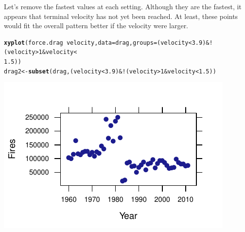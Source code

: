 \documentclass[twoside]{book}
\makeatletter
\def\maxwidth{ %
  \ifdim\Gin@nat@width>\linewidth
    \linewidth
  \else
    \Gin@nat@width
  \fi
}
\newcommand{\hlnum}[1]{\textcolor[rgb]{0.686,0.059,0.569}{#1}}%
\newcommand{\hlopt}[1]{\textcolor[rgb]{0,0,0}{#1}}%
\newcommand{\hlstd}[1]{\textcolor[rgb]{0.345,0.345,0.345}{#1}}%
\newcommand{\hlkwb}[1]{\textcolor[rgb]{0.69,0.353,0.396}{#1}}%
\newcommand{\hlkwc}[1]{\textcolor[rgb]{0.333,0.667,0.333}{#1}}%
\newcommand{\hlkwd}[1]{\textcolor[rgb]{0.737,0.353,0.396}{\textbf{#1}}}%
\newenvironment{kframe}{%
 \def\at@end@of@kframe{}%
 \ifinner\ifhmode%
  \def\at@end@of@kframe{\end{minipage}}%
  \begin{minipage}{\columnwidth}%
 \fi\fi%
 \def\FrameCommand##1{\hskip\@totalleftmargin \hskip-\fboxsep
 \colorbox{shadecolor}{##1}\hskip-\fboxsep
     \hskip-\linewidth \hskip-\@totalleftmargin \hskip\columnwidth}%
 \MakeFramed {\advance\hsize-\width
   \@totalleftmargin\z@ \linewidth\hsize
   \@setminipage}}%
 {\par\unskip\endMakeFramed%
 \at@end@of@kframe}
\newenvironment{knitrout}{}{} %
\makeatother
\begin{document}
\begin{solution}
Let's remove the fastest values at each setting.  Although they are the fastest, it appears 
that terminal velocity has not yet been reached.  At least, these points would fit the 
overall pattern better if the velocity were larger.
\begin{knitrout}
\color{fgcolor}\begin{kframe}
\begin{alltt}
\hlkwd{xyplot}\hlstd{(force.drag} \hlopt{~} \hlstd{velocity,} \hlkwc{data} \hlstd{= drag,} \hlkwc{groups} \hlstd{= (velocity} \hlopt{<} \hlnum{3.9}\hlstd{)} \hlopt{& !}\hlstd{(velocity} \hlopt{>} \hlnum{1} \hlopt{&} \hlstd{velocity} \hlopt{<}
    \hlnum{1.5}\hlstd{))}
\hlstd{drag2} \hlkwb{<-} \hlkwd{subset}\hlstd{(drag, (velocity} \hlopt{<} \hlnum{3.9}\hlstd{)} \hlopt{& !}\hlstd{(velocity} \hlopt{>} \hlnum{1} \hlopt{&} \hlstd{velocity} \hlopt{<} \hlnum{1.5}\hlstd{))}
\end{alltt}
\end{kframe}

{\centering \includegraphics[width=\maxwidth]{figures/fig-unnamed-chunk-29-1} 

}




\end{knitrout}
\end{solution}
\end{document}
